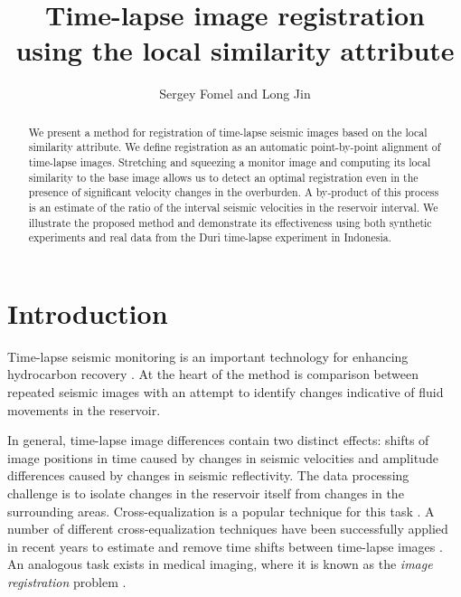 \title{Time-lapse image registration using the local similarity attribute}
\author{Sergey Fomel and Long Jin}

\address{
John A. and Katherine G. Jackson School of Geosciences \\
The University of Texas at Austin \\
University Station, Box X \\
Austin, TX 78713-8924}


\maketitle

\begin{abstract}
  We present a method for registration of time-lapse seismic images
  based on the local similarity attribute. We define registration as
  an automatic point-by-point alignment of time-lapse images.
  Stretching and squeezing a monitor image and computing its local
  similarity to the base image allows us to detect an optimal
  registration even in the presence of significant velocity changes in
  the overburden.  A by-product of this process is an estimate of the
  ratio of the interval seismic velocities in the reservoir
  interval. We illustrate the proposed method and demonstrate its
  effectiveness using both synthetic experiments and real data from
  the Duri time-lapse experiment in Indonesia.
\end{abstract}

\section{Introduction}
Time-lapse seismic monitoring is an important technology for enhancing
hydrocarbon recovery \cite[]{GEO66-01-00500053}. At the heart of the
method is comparison between repeated seismic images with an attempt
to identify changes indicative of fluid movements in the reservoir.

In general, time-lapse image differences contain two distinct effects:
shifts of image positions in time caused by changes in seismic
velocities and amplitude differences caused by changes in seismic
reflectivity. The data processing challenge is to isolate changes in
the reservoir itself from changes in the surrounding
areas. Cross-equalization is a popular technique for this task
\cite[]{GEO66-04-10151025,stucchi}.  A number of different
cross-equalization techniques have been successfully applied in recent
years to estimate and remove time shifts between 
time-lapse images \cite[]{bertrand,aarre}. An analogous task 
exists in medical imaging, where it is known as the \emph{image
registration} problem \cite[]{medical}.

